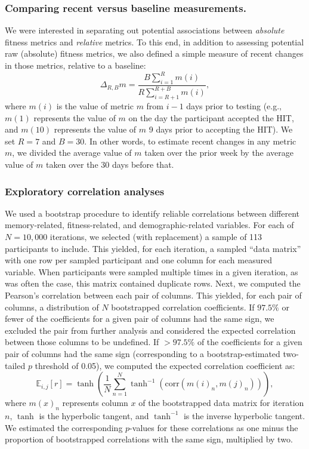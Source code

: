 \documentclass[10pt]{article}
\begin{document}
\subsubsection*{Comparing recent versus baseline measurements.}
We were interested in separating out potential associations between
\textit{absolute} fitness metrics and \textit{relative} metrics.  To
this end, in addition to assessing potential raw (absolute) fitness
metrics, we also defined a simple measure of recent changes in those
metrics, relative to a baseline:
\[
  \Delta_{R, B} m = \frac{B \sum_{i = 1}^R
  m(i)}{R \sum_{i=R + 1}^{R+B}m(i)},
\]
where $m(i)$ is the value of metric $m$ from $i - 1$ days prior to
testing (e.g., $m(1)$ represents the value of $m$ on the day the
participant accepted the HIT, and $m(10)$ represents the value of $m$
9 days prior to accepting the HIT).  We set $R = 7$ and $B = 30$.  In
other words, to estimate recent changes in any metric $m$, we divided
the average value of $m$ taken over the prior week by the average
value of $m$ taken over the 30 days before that.


\subsubsection*{Exploratory correlation analyses}
We used a bootstrap procedure to identify reliable correlations
between different memory-related, fitness-related, and
demographic-related variables.  For each of $N = 10,000$ iterations, we
selected (with replacement) a sample of 113 participants to include.
This yielded, for each iteration, a sampled ``data matrix'' with one
row per sampled participant and one column for each measured variable.
When participants were sampled multiple times in a given iteration, as
was often the case, this matrix contained duplicate rows.  Next, we computed the Pearson's correlation
between each pair of columns.  This yielded, for each pair of columns,
a distribution of $N$ bootstrapped correlation coefficients.  If
$97.5\%$ or fewer of the coefficients for a given pair of columns had the
same sign, we excluded the pair from further analysis and considered
the expected correlation between those columns to be undefined.  If
$> 97.5\%$ of the coefficients for a given pair of columns had the
same sign (corresponding to a bootstrap-estimated two-tailed $p$
threshold of 0.05), we computed the expected correlation coefficient as:
\[
  \mathbb{E}_{i, j}\left[ r\right] = \tanh\left(\frac{1}{N} \sum_{n=1}^N
  \tanh^{-1}(\mathrm{corr}\left(m(i)_n, m(j)_n\right))\right),
\]
where $m(x)_n$ represents column $x$ of the bootstrapped data matrix
for iteration $n$, $\tanh$ is the hyperbolic tangent, and $\tanh^{-1}$
is the inverse hyperbolic tangent.  We estimated the corresponding $p$-values
for these correlations as one minus the proportion of bootstrapped
correlations with the same sign, multiplied by two.
\end{document}
